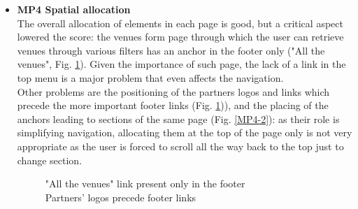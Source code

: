 \begin{itemize}
    \item \textbf{MP4 Spatial allocation}\\
        The overall allocation of elements in each page is good, but a critical aspect lowered the score: the venues form page through which the user can retrieve venues through various filters has an anchor in the footer only ("All the venues", Fig. \ref{MP4-1}). Given the importance of such page, the lack of a link in the top menu is a major problem that even affects the navigation.\\
        Other problems are the positioning of the partners logos and links which precede the more important footer links (Fig. \ref{MP4-1})), and the placing of the anchors leading to sections of the same page (Fig. \ref{MP4-2}): as their role is simplifying navigation, allocating them at the top of the page only is not very appropriate as the user is forced to scroll all the way back to the top just to change section.
        \begin{figure}[!ht]
            \begin{minipage}{\linewidth}
                \centering
                \captionsetup{justification=centering}
                \caption{"All the venues" link present only in the footer\\Partners' logos precede footer links}
                \label{MP4-1}
            \end{minipage}
        \end{figure}
        \begin{figure}[!ht]
            \begin{minipage}{\linewidth}
                \centering

\end{minipage}
\end{figure}
\end{itemize}
